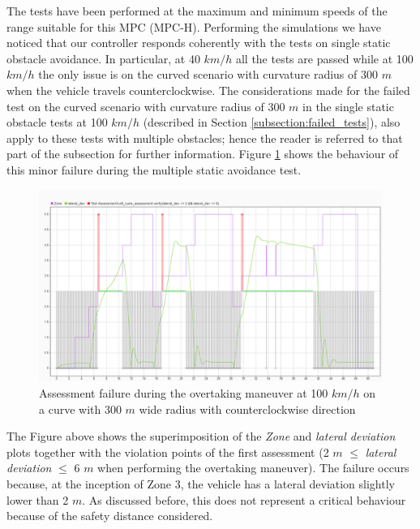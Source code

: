 The tests have been performed at the maximum and minimum speeds of the range suitable for this MPC (MPC-H). Performing the simulations we have noticed that our controller responds coherently with the tests on single static obstacle avoidance. In particular, at 40 $km/h$ all the tests are passed while at 100 $km/h$ the only issue is on the curved scenario with curvature radius of 300 $m$ when the vehicle travels counterclockwise.
The considerations made for the failed test on the curved scenario with curvature radius of 300 $m$ in the single static obstacle tests at 100 $km/h$ (described in Section \ref{subsection:failed_tests}), also apply to these tests with multiple obstacles; hence the reader is referred to that part of the subsection for further information. Figure \ref{fig:fail} shows the behaviour of this minor failure during the multiple static avoidance test.
\begin{figure}[H]
    \centering
    \includegraphics[width=1\textwidth,keepaspectratio]{Figures/failed.png}
    \caption{Assessment failure during the overtaking maneuver at 100 $km/h$ on a curve with 300 $m$ wide radius with counterclockwise direction }
    \label{fig:fail}
\end{figure}
The Figure above shows the superimposition of the \textit{Zone} and \textit{lateral deviation} plots together with the violation points of the first assessment (2 $m$ $\leq$ \textit{lateral deviation} $\leq$ 6 $m$ when performing the overtaking maneuver).
The failure occurs because, at the inception of Zone 3, the vehicle has a lateral deviation slightly lower than 2 $m$. As discussed before, this does not represent a critical behaviour because of the safety distance considered.
